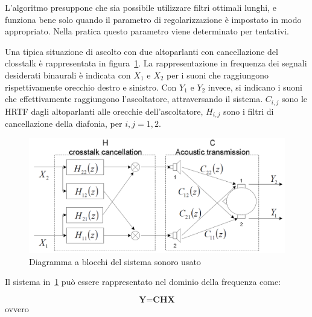 \documentclass[12pt,a4paper,titlepage]{article}
\begin{document}
L'algoritmo presuppone che sia possibile utilizzare filtri ottimali lunghi, e funziona bene solo quando il parametro di regolarizzazione è impostato in modo appropriato. Nella pratica questo parametro viene determinato per tentativi.%

Una tipica situazione di ascolto con due altoparlanti con cancellazione del closstalk è rappresentata in figura~\ref{fig:head}. La rappresentazione in frequenza dei segnali desiderati binaurali è indicata con $X_1$ e $X_2$ per i suoni che raggiungono rispettivamente orecchio destro e sinistro.
Con $Y_1$ e $Y_2$ invece, si indicano i suoni che effettivamente raggiungono l'ascoltatore, attraversando il sistema. $C_{i, j}$ sono le HRTF dagli altoparlanti alle orecchie dell'ascoltatore, $H_{i,j}$ sono i filtri di cancellazione della diafonia, per $i , j =1,2$.

\begin{figure}[h]
	\centering	
	\includegraphics[width=1\textwidth]{Immagini/head}
	\caption{Diagramma a blocchi del sistema sonoro usato}
	\label{fig:head}
\end{figure}
Il sistema in~\ref{fig:head} può essere rappresentato nel dominio della frequenza come:

\begin{equation}
\textbf{Y} = \textbf{CHX}
\end{equation}
ovvero
\end{document}
